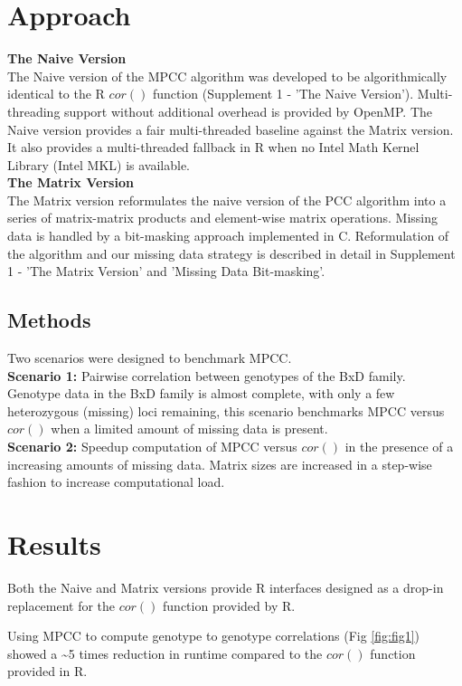 \documentclass{bioinfo}
\begin{document}
\section{Approach}
\textbf{The Naive Version}\\
The Naive version of the MPCC algorithm was developed to be algorithmically identical
to the R $cor()$ function (Supplement 1 - 'The Naive Version'). Multi-threading
support without additional overhead is provided by OpenMP. The Naive version
provides a fair multi-threaded baseline against the Matrix version. It also provides
a multi-threaded fallback in R when no Intel\textregistered{} Math Kernel Library
(Intel\textregistered{} MKL) is available.\\
\textbf{The Matrix Version}\\
The Matrix version reformulates the naive version of the PCC algorithm
into a series of matrix-matrix products and element-wise matrix operations.
Missing data is handled by a bit-masking approach implemented in C.
Reformulation of the algorithm and our missing data strategy is described
in detail in Supplement 1 - 'The Matrix Version' and 'Missing Data Bit-masking'.
\vspace*{-5mm}
\begin{methods}
\section{Methods}
Two scenarios were designed to benchmark MPCC.\\
{\bf Scenario 1:} Pairwise correlation between genotypes of the BxD family.
Genotype data in the BxD family is almost complete, with only a few heterozygous
(missing) loci remaining, this scenario benchmarks MPCC versus $cor()$ when a limited
amount of missing data is present.\\
{\bf Scenario 2:} Speedup computation of MPCC versus $cor()$ in the presence of a
increasing amounts of missing data. Matrix sizes are increased in a step-wise fashion
to increase computational load.
\end{methods}
\vspace*{-2mm}
\section{Results}
Both the Naive and Matrix versions provide R interfaces designed as a drop-in
replacement for the $cor()$ function provided by R.

Using MPCC to compute genotype to genotype correlations (Fig \ref{fig:fig1})
showed a \textasciitilde{}5 times reduction in runtime compared to the
$cor()$ function provided in R.
\end{document}
